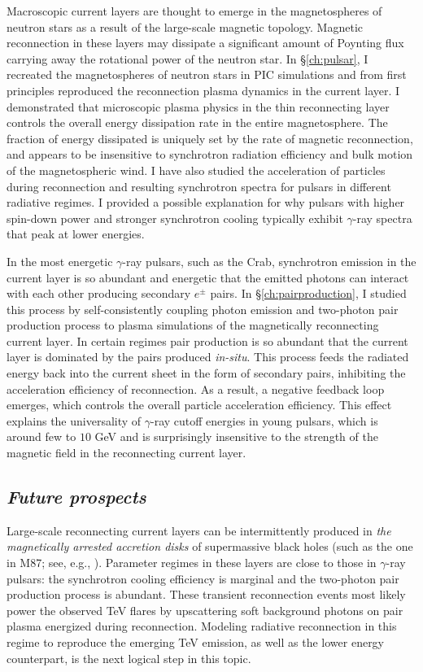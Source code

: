 Macroscopic current layers are thought to emerge in the magnetospheres of neutron stars as a result of the large-scale magnetic topology. Magnetic reconnection in these layers may dissipate a significant amount of Poynting flux carrying away the rotational power of the neutron star. In \S\ref{ch:pulsar}, I recreated the magnetospheres of neutron stars in PIC simulations and from first principles reproduced the reconnection plasma dynamics in the current layer. I demonstrated that microscopic plasma physics in the thin reconnecting layer controls the overall energy dissipation rate in the entire magnetosphere. The fraction of energy dissipated is uniquely set by the rate of magnetic reconnection, and appears to be insensitive to synchrotron radiation efficiency and bulk motion of the magnetospheric wind. I have also studied the acceleration of particles during reconnection and resulting synchrotron spectra for pulsars in different radiative regimes. I provided a possible explanation for why pulsars with higher spin-down power and stronger synchrotron cooling typically exhibit $\gamma$-ray spectra that peak at lower energies. 

In the most energetic $\gamma$-ray pulsars, such as the Crab, synchrotron emission in the current layer is so abundant and energetic that the emitted photons can interact with each other producing secondary $e^\pm$ pairs. In \S\ref{ch:pairproduction}, I studied this process by self-consistently coupling photon emission and two-photon pair production process to plasma simulations of the magnetically reconnecting current layer. In certain regimes pair production is so abundant that the current layer is dominated by the pairs produced \emph{in-situ}. This process feeds the radiated energy back into the current sheet in the form of secondary pairs, inhibiting the acceleration efficiency of reconnection. As a result, a negative feedback loop emerges, which controls the overall particle acceleration efficiency. This effect explains the universality of $\gamma$-ray cutoff energies in young pulsars, which is around few to $10$ GeV and is surprisingly insensitive to the strength of the magnetic field in the reconnecting current layer.

\subsection*{\small \it Future prospects}

Large-scale reconnecting current layers can be intermittently produced in \emph{the magnetically arrested accretion disks} of supermassive black holes (such as the one in M87; see, e.g., \citealt{2020ApJ...900..100R,ripperdainprep}). Parameter regimes in these layers are close to those in $\gamma$-ray pulsars: the synchrotron cooling efficiency is marginal and the two-photon pair production process is abundant. These transient reconnection events most likely power the observed TeV flares \citep[see, e.g.,][]{2006Sci...314.1424A} by upscattering soft background photons on pair plasma energized during reconnection. Modeling radiative reconnection in this regime to reproduce the emerging TeV emission, as well as the lower energy counterpart, is the next logical step in this topic. 

